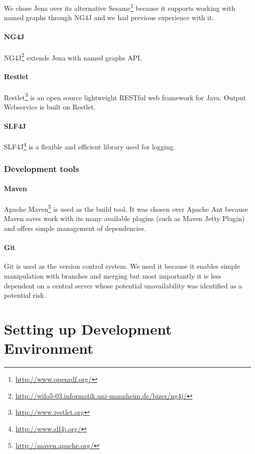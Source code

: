We chose Jena over its alternative Sesame\footnote{\url{http://www.openrdf.org/}} because it supports working with named graphs through NG4J and we had previous experience with it.

\subsubsection*{NG4J}
NG4J\footnote{\url{http://wifo5-03.informatik.uni-mannheim.de/bizer/ng4j/}} extends Jena with named graphs API.

\subsubsection*{Restlet}
Restlet\footnote{\url{http://www.restlet.org}} is an open source lightweight RESTful web framework for Java. Output Webservice is built on Restlet.

\subsubsection*{SLF4J}
SLF4J\footnote{\url{http://www.slf4j.org/}} is a flexible and efficient library used for logging. 

\subsection{Development tools}
\subsubsection*{Maven}
Apache Maven\footnote{\url{http://maven.apache.org/}} is used as the build tool. It was chosen over Apache Ant because Maven saves work with its many available plugins (such as Maven Jetty Plugin) and offers simple management of dependencies.

\subsubsection*{Git}
Git is used as the version control system. We used it because it enables simple manipulation with branches and merging but most importantly it is less dependent on a central server whose potential unavailability was identified as a potential risk.



\chapter{Setting up Development Environment}

